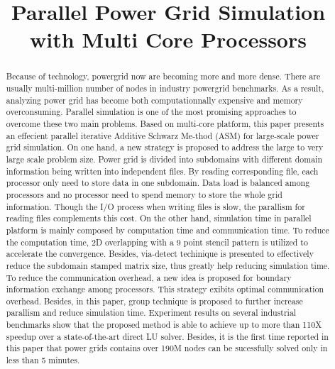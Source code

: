 \documentclass{sig-alternate}
\begin{document}
\title{Parallel Power Grid Simulation with Multi Core Processors}

\maketitle

\begin{abstract}
	Because of technology, powergrid now are becoming more and more dense. There are usually multi-million number of nodes in
	industry powergrid benchmarks. As a result, analyzing power grid has become both computationnally expensive and memory 
	overconsuming. Parallel simulation is one of the most promising approaches to overcome these two main problems. Based on 
	multi-core platform, this paper presents an effecient parallel iterative Additive Schwarz Me-thod (ASM) for large-scale 
	power grid simulation. On one hand, a new strategy is proposed to address the large to very large scale problem size. Power 
	grid is divided into subdomains with different domain information being written into independent files. By reading corresponding 
	file, each processor only need to store data in one subdomain. Data load is balanced among processors and no processor
	need to spend memory to store the whole grid information. Though the I/O process when writing files is slow, the parallism 
	for reading files complements this cost. On the other hand, simulation time in parallel platform is mainly composed by 
	computation time and communication time. To reduce the computation time, 2D overlapping with a 9 point stencil pattern is 
	utilized to accelerate the convergence. Besides, via-detect techinique is presented to effectively reduce the subdomain 
	stamped matrix size, thus greatly help reducing simulation time. To reduce the communication overhead, a new idea is 
	proposed for boundary information exchange among processors. This strategy exibits optimal 
	communication overhead. Besides, in this paper, group technique is proposed to further increase parallism and reduce 
	simulation time. Experiment results on several industrial benchmarks show that the proposed method is able to achieve up to 
	more than 110X speedup over a state-of-the-art direct LU solver. Besides, it is the first time reported in this paper that 
	power grids contains over 190M nodes can be sucessfully solved only in less than 5 minutes.
\end{abstract}
\end{document}
